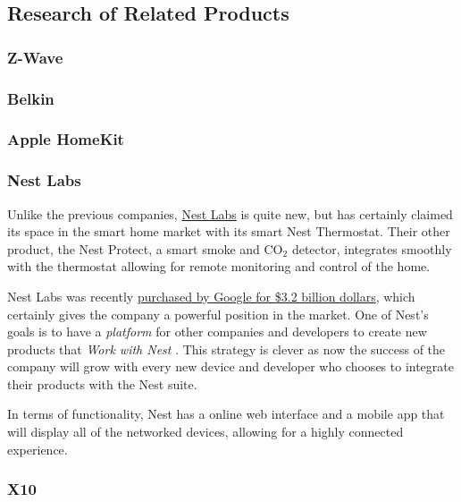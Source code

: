 \subsection{Research of Related Products}

\subsubsection{Z-Wave}

\subsubsection{Belkin}

\subsubsection{Apple HomeKit}

\subsubsection{Nest Labs}
Unlike the previous companies, \href{http://nest.com}{Nest Labs} is quite new,
but has certainly claimed its space in the smart home market with its smart
Nest Thermostat. Their other product, the Nest Protect, a smart smoke and
CO$_2$ detector, integrates smoothly with the thermostat allowing for remote
monitoring and control of the home.

Nest Labs was recently
\href{http://www.forbes.com/sites/greatspeculations/2014/01/17/googles-strategy-behind-the-3-2-billion-acquisition-of-nest-labs/}{purchased by Google for \$3.2 billion dollars},
which certainly gives the company a powerful position in the market. One of
Nest's goals is to have a \emph{platform} for other companies and developers to
create new products that \emph{Work with Nest \texttrademark}. This strategy is
clever as now the success of the company will grow with every new device and
developer who chooses to integrate their products with the Nest suite.

In terms of functionality, Nest has a online web interface and a mobile app
that will display all of the networked devices, allowing for a highly connected
experience.

\subsubsection{X10}

